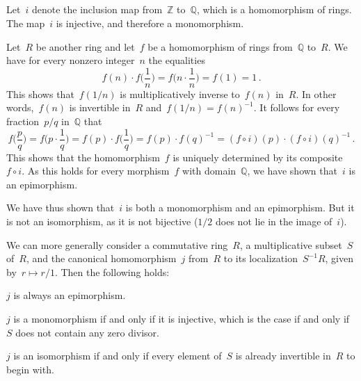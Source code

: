 \subsection{}

Let~$i$ denote the inclusion map from~$ℤ$ to~$ℚ$, which is a homomorphism of rings.
The map~$i$ is injective, and therefore a monomorphism.

Let~$R$ be another ring and let~$f$ be a homomorphism of rings from~$ℚ$ to~$R$.
We have for every nonzero integer~$n$ the equalities
\[
	f(n) ⋅ f\biggl(\frac{1}{n}\biggr)
	= f\biggl(n ⋅\frac{1}{n}\biggr)
	= f(1)
	= 1 \,.
\]
This shows that~$f(1/n)$ is multiplicatively inverse to~$f(n)$ in~$R$.
In other words,~$f(n)$ is invertible in~$R$ and~$f(1 / n) = f(n)^{-1}$.
It follows for every fraction~$p / q$ in~$ℚ$ that
\[
	f\biggl(\frac{p}{q}\biggr)
	= f\biggl(p ⋅ \frac{1}{q}\biggr)
	= f(p) ⋅ f\biggl(\frac{1}{q}\biggr)
	= f(p) ⋅ f(q)^{-1}
	= (f ∘ i)(p) ⋅ (f ∘ i)(q)^{-1} \,.
\]
This shows that the homomorphism~$f$ is uniquely determined by its composite~$f ∘ i$.
As this holds for every morphism~$f$ with domain~$ℚ$, we have shown that~$i$ is an epimorphism.

We have thus shown that~$i$ is both a monomorphism and an epimorphism.
But it is not an isomorphism, as it is not bijective ($1/2$ does not lie in the image of~$i$).

We can more generally consider a commutative ring~$R$, a multiplicative subset~$S$ of~$R$, and the canonical homomorphism~$j$ from~$R$ to its localization~$S^{-1} R$, given by~$r \mapsto r / 1$.
Then the following holds:
\begin{itemize*}

	\item
		$j$ is always an epimorphism.

	\item
		$j$ is a monomorphism if and only if it is injective, which is the case if and only if~$S$ does not contain any zero divisor.

	\item
		$j$ is an isomorphism if and only if every element of~$S$ is already invertible in~$R$ to begin with.

\end{itemize*}
